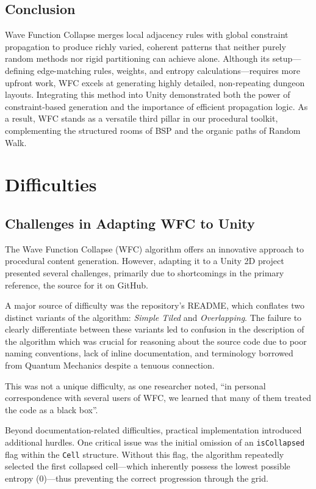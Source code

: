 \documentclass[a4paper, 12pt, one column, aas_macros]{article}
\begin{document}
\subsection{Conclusion}
Wave Function Collapse merges local adjacency rules with global constraint propagation to produce richly varied, coherent patterns that neither purely random methods nor rigid partitioning can achieve alone. Although its setup---defining edge-matching rules, weights, and entropy calculations---requires more upfront work, WFC excels at generating highly detailed, non-repeating dungeon layouts. Integrating this method into Unity demonstrated both the power of constraint-based generation and the importance of efficient propagation logic. As a result, WFC stands as a versatile third pillar in our procedural toolkit, complementing the structured rooms of BSP and the organic paths of Random Walk.

\section{Difficulties}
\subsection{Challenges in Adapting WFC to Unity}
The Wave Function Collapse (WFC) algorithm offers an innovative approach to procedural content generation. However, adapting it to a Unity 2D project presented several challenges, primarily due to shortcomings in the primary reference, the source for it on GitHub. \cite{mxgmn}

A major source of difficulty was the repository's README, which conflates two distinct variants of the algorithm: \emph{Simple Tiled} and \emph{Overlapping}. The failure to clearly differentiate between these variants led to confusion in the description of the algorithm which was crucial for reasoning about the source code due to poor naming conventions, lack of inline documentation, and terminology borrowed from Quantum Mechanics despite a tenuous connection.

This was not a unique difficulty, as one researcher noted, ``in personal correspondence with several users of WFC, we learned that many of them treated the code as a black box''. \citep{karth}

Beyond documentation-related difficulties, practical implementation introduced additional hurdles. One critical issue was the initial omission of an \texttt{isCollapsed} flag within the \texttt{Cell} structure. Without this flag, the algorithm repeatedly selected the first collapsed cell---which inherently possess the lowest possible entropy (0)---thus preventing the correct progression through the grid.
\end{document}
